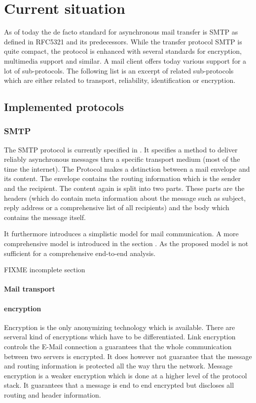 \chapter{Current situation}
As of today the de facto standard for asynchronous mail transfer is SMTP as defined in RFC5321\cite{RFC5321} and its predecessors. While the transfer protocol SMTP is quite compact, the protocol is enhanced with several standards for encryption, multimedia support and similar. A mail client offers today various support for a lot of sub-protocols. The following list is an excerpt of related sub-protocols which are either related to transport, reliability, identification or encryption. 

\section{Implemented protocols}
\subsection{SMTP }
The SMTP protocol is currently specified in \cite{RFC5321}. It specifies a method to deliver reliably asynchronous messages thru a specific transport medium (most of the time the internet). The Protocol makes a dstinction between a mail envelope and its content. The envelope contains the routing information which is the sender and the recipient. The content again is split into two parts. These parts are the headers (which do contain meta information about the message such as subject, reply address or a comprehensive list of all recipients) and the body which contains the message itself.\par

It furthermore introduces a simplistic model for mail communication. A more comprehensive model is introduced in the section . As the proposed model is not sufficient for a comprehensive end-to-end analysis.\par



FIXME incomplete section

\subsubsection{Mail transport}
\cite{RFC1870}
\subsubsection{encryption}
Encryption is the only anonymizing technology which is available. There are serveral kind of encryptions which have to be differentiated. Link encryption controls the E-Mail connection a guarantees that the whole communication between two servers is encrypted. It does however not guarantee that the message and routing information is protected all the way thru the network. Message encryption is a weaker encryption which is done at a higher level of the protocol stack. It guarantees that a message is end to end encrypted but discloses all routing and header information.\par

